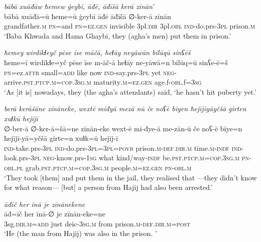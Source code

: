 \ea \label{BP.131}
\textit{bābā xuāđāw ħemew ġeybī, āđē, āđīšā kerā zīnān’} \\ 
\gll bābā xuāđā=ū ħeme=ū ġeybī āđē āđīšā ∅-ker-ā zīnān \\ 
 grandfather\textsc{.m} \textsc{pn}=and \textsc{pn}\textsc{=ez.gen} invisible 3pl\textsc{.dir} 3pl\textsc{.obl} \textsc{ind-}do.prs\textsc{-3pl} prison\textsc{.m} \\ 
\glt `Baba Khwada and Hama Ghaybi, they (agha’s men) put them  in prison.'
\z 
 
\ea \label{BP.132}
\textit{ħemey wirdīkɫeyč pēse īse māčā, heɫāy neyāwān bilūqū sinʕēš} \\ 
\gll ħeme=ī wirdīkɫe=yč pēse īse m-āč-ā heɫāy ne-yāwā=n bilūq=ū sinʕe-ē=š \\ 
 \textsc{pn}=ez.\textsc{attr} small\textsc{=add} like now \textsc{ind-}say.prs\textsc{-3pl} yet \textsc{neg-}arrive\textsc{.pst}\textsc{.ptcp}\textsc{.m}\textsc{=cop}\textsc{.3sg}\textsc{.m} maturity\textsc{.m}\textsc{=ez.gen} age.f\textsc{-obl}.f\textsc{=3sg} \\ 
\glt `As [it is] nowadays, they (the agha’s attendants) said, ‘he hasn’t hit puberty yet.'
\z 
 
\ea \label{BP.139}
\textit{berā kerāšāne zīnāneke, wextē miđyā mezā nū če noʕē bīyen ħejījīyāyčšā girten xuɫkū hejījī} \\ 
\gll ∅-ber-ā ∅-ker-ā=šā=ne zīnān-eke wext-ē mi-đye-ā me-zān-ū če noʕ-ē bīye=n ħejījī-yā=yčšā girte=n xuɫk=ū hejīj-ī \\ 
 \textsc{ind-}take.prs\textsc{-3pl} \textsc{ind-}do.prs\textsc{-3pl}\textsc{=3pl}\textsc{=\textsc{povb}} prison\textsc{.m}\textsc{-def}\textsc{.dir}\textsc{.m} time\textsc{.m}\textsc{-indf} \textsc{ind-}look.prs\textsc{-3pl} \textsc{neg-}know.prs\textsc{-\textsc{1sg}} what kind/way\textsc{-indf} be\textsc{.pst}\textsc{.ptcp}\textsc{.m}\textsc{=cop}\textsc{.3sg}\textsc{.m} \textsc{pn}\textsc{-obl}\textsc{.pl} grab\textsc{.pst}\textsc{.ptcp}\textsc{.m}\textsc{=cop}\textsc{.3sg}\textsc{.m} people\textsc{.m}\textsc{=ez.gen} \textsc{pn}\textsc{-obl}\textsc{.m} \\ 
\glt `They took [them] and put them in the jail, they realised that —they didn’t know for what reason— [but] a person from Hajij had also been arrested.'
\z 
 
\ea \label{BP.140}
\textit{āđīč her īnā je zīnānekene} \\ 
\gll āđ=īč her īnā-∅ je zīnān-eke=ne \\ 
 3sg\textsc{.dir}\textsc{.m}\textsc{=add} just deic\textsc{-3sg}\textsc{.m} from prison\textsc{.m}\textsc{-def}\textsc{.dir}\textsc{.m}\textsc{=\textsc{post}} \\ 
\glt `He (the man from Hajij) was also in the prison. '
\z 
 
